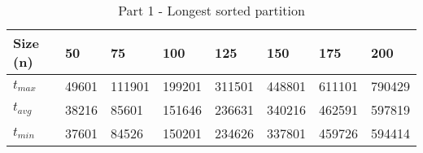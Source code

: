 \usepackage{array}
\usepackage{tabu}
\usepackage{siunitx}
\usepackage{booktabs}%

\begin{table}[h!]
\fontsize{8}{11}\selectfont
\begin{center}
\begin{tabu} to 0.5\textwidth {|X[c]|X[c]|X[c]|X[c]|X[c]|X[c]|X[c]|X[c]|} 
 \hline
 Size (n) & 50 & 75 & 100 & 125 & 150 & 175 & 200 \\
 \hline\hline
 $t_{max}$ & 49601 & 111901 & 199201 & 311501 & 448801 & 611101 & 790429 \\
 \hline
 $t_{avg}$ & 38216 & 85601 & 151646 & 236631 & 340216 & 462591 & 597819 \\
 \hline
 $t_{min}$ & 37601 & 84526 & 150201 & 234626 & 337801 & 459726 & 594414 \\
 \hline
\end{tabu}
\label{partition_table}
\caption{Part 1 - Longest sorted partition}
\end{center}
\end{table}
